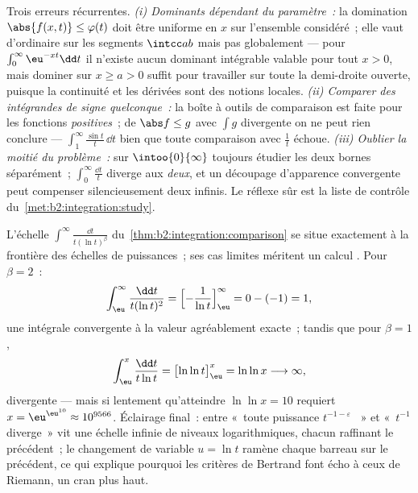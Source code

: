 \begin{remark}
Trois erreurs récurrentes. \emph{(i) Dominants dépendant du
paramètre~:} la domination $\abs{f(x,t)} \leq \varphi(t)$ doit
être uniforme en $x$ sur l'ensemble considéré~; elle vaut d'ordinaire sur les
segments $\intcc ab$ mais pas globalement --- pour
$\int_0^\infty\eu^{-xt}\dd t$ il n'existe aucun dominant intégrable
valable pour tout $x > 0$, mais dominer sur $x \geq a > 0$ suffit
pour travailler sur toute la demi-droite ouverte, puisque la continuité
et les dérivées sont des notions locales. \emph{(ii) Comparer des
intégrandes de signe quelconque~:} la boîte à outils de comparaison est faite pour les
fonctions \emph{positives}~; de $\abs f \leq g$ avec $\int g$ divergente on ne peut
rien conclure --- $\int_1^\infty\frac{\sin t}t\,\dd t$
 bien que toute comparaison avec $\frac1t$ échoue.
\emph{(iii) Oublier la moitié du problème~:} sur
$\intoo{0}{\infty}$ toujours étudier les deux bornes séparément~;
$\int_0^\infty\frac{\dd t}{t}$ diverge aux \emph{deux}, et un
découpage d'apparence convergente peut compenser silencieusement deux infinis.
Le réflexe sûr est la liste de contrôle du~\cref{met:b2:integration:study}.
\end{remark}

\begin{example}\label{ex:b2:integration:bertrandboundary}
L'échelle $\int^\infty\frac{\dd t}{t(\ln t)^\beta}$ du~\cref{thm:b2:integration:comparison}
se situe exactement à la frontière des échelles de puissances~; ses cas limites méritent un
calcul . Pour $\beta = 2$~:
\[
\int_\eu^{\infty}\frac{\dd t}{t(\ln t)^2}
= \Bigl[-\frac{1}{\ln t}\Bigr]_\eu^{\infty}
= 0 - (-1) = 1 ,
\]
une intégrale convergente à la valeur agréablement exacte~; tandis que pour
$\beta = 1$,
\[
\int_\eu^{x}\frac{\dd t}{t\ln t}
= \bigl[\ln\ln t\bigr]_\eu^{x} = \ln\ln x
\longrightarrow \infty ,
\]
divergente --- mais si lentement qu'atteindre $\ln\ln x = 10$
requiert $x = \eu^{\eu^{10}} \approx 10^{9566}$. Éclairage
final~: entre «~toute puissance $t^{-1-\varepsilon}$
~» et «~$t^{-1}$ diverge~» vit une échelle infinie
de niveaux logarithmiques, chacun raffinant le précédent~; le changement de variable
$u = \ln t$ ramène chaque barreau sur le précédent, ce qui
explique pourquoi les critères de Bertrand font écho à ceux de Riemann,
un cran plus haut.
\end{example}

